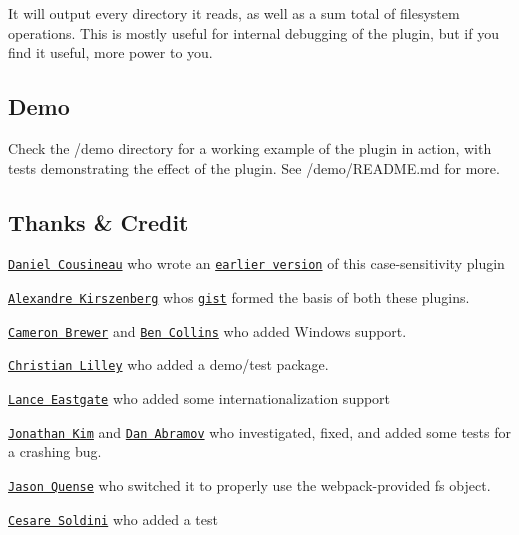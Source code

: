 It will output every directory it reads, as well as a sum total of filesystem operations. This is mostly useful for internal debugging of the plugin, but if you find it useful, more power to you.

\subsection*{Demo }

Check the {\ttfamily /demo} directory for a working example of the plugin in action, with tests demonstrating the effect of the plugin. See {\ttfamily /demo/\+R\+E\+A\+D\+ME.md} for more.

\subsection*{Thanks \& Credit }


\begin{DoxyItemize}
\item \href{https://github.com/dcousineau}{\tt Daniel Cousineau} who wrote an \href{https://github.com/dcousineau/force-case-sensitivity-webpack-plugin}{\tt earlier version} of this case-\/sensitivity plugin
\item \href{https://github.com/Morhaus}{\tt Alexandre Kirszenberg} who\textquotesingle{}s \href{https://gist.github.com/Morhaus/333579c2a5b4db644bd5}{\tt gist} formed the basis of both these plugins.
\item \href{https://github.com/morethanfire}{\tt Cameron Brewer} and \href{https://github.com/aggieben}{\tt Ben Collins} who added Windows support.
\item \href{https://github.com/xml}{\tt Christian Lilley} who added a demo/test package.
\item \href{https://github.com/NorwegianKiwi}{\tt Lance Eastgate} who added some internationalization support
\item \href{https://github.com/jkimbo}{\tt Jonathan Kim} and \href{https://github.com/gaearon}{\tt Dan Abramov} who investigated, fixed, and added some tests for a crashing bug.
\item \href{https://github.com/jquense}{\tt Jason Quense} who switched it to properly use the webpack-\/provided fs object.
\item \href{https://github.com/caesarsol}{\tt Cesare Soldini} who added a test 
\end{DoxyItemize}